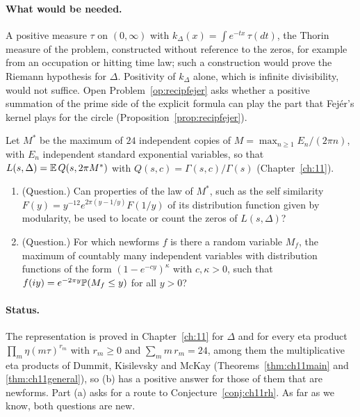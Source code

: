 \paragraph{What would be needed.} A positive measure $\tau$ on $(0,\infty)$ with $k_\Delta(x)=\int e^{-tx}\,\tau(dt)$, the Thorin measure of the problem, constructed without reference to the zeros, for example from an occupation or hitting time law; such a construction would prove the Riemann hypothesis for $\Delta$. Positivity of $k_\Delta$ alone, which is infinite divisibility, would not suffice. Open Problem~\ref{op:recipfejer} asks whether a positive summation of the prime side of the explicit formula can play the part that Fej\'er's kernel plays for the circle (Proposition~\ref{prop:recipfejer}).

\begin{problem}\label{op:ev}
Let $M^*$ be the maximum of $24$ independent copies of $M=\max_{n\ge1}E_n/(2\pi n)$, with $E_n$ independent standard exponential variables, so that $L(s,\Delta)=\mathbb{E}\,Q(s,2\pi M^*)$ with $Q(s,c)=\Gamma(s,c)/\Gamma(s)$ (Chapter~\ref{ch:11}).
\begin{enumerate}[label=(\alph*)]
\item (Question.) Can properties of the law of $M^*$, such as the self similarity $F(y)=y^{-12}e^{2\pi(y-1/y)}F(1/y)$ of its distribution function given by modularity, be used to locate or count the zeros of $L(s,\Delta)$?
\item (Question.) For which newforms $f$ is there a random variable $M_f$, the maximum of countably many independent variables with distribution functions of the form $(1-e^{-cy})^{\kappa}$ with $c,\kappa>0$, such that $f(iy)=e^{-2\pi y}\mathbb{P}(M_f\le y)$ for all $y>0$?
\end{enumerate}
\end{problem}

\paragraph{Status.} The representation is proved in Chapter~\ref{ch:11} for $\Delta$ and for every eta product $\prod_m\eta(m\tau)^{r_m}$ with $r_m\ge0$ and $\sum_m m\,r_m=24$, among them the multiplicative eta products of Dummit, Kisilevsky and McKay \cite{dkm1985} (Theorems~\ref{thm:ch11main} and \ref{thm:ch11general}), so (b) has a positive answer for those of them that are newforms. Part (a) asks for a route to Conjecture~\ref{conj:ch11rh}. As far as we know, both questions are new.

